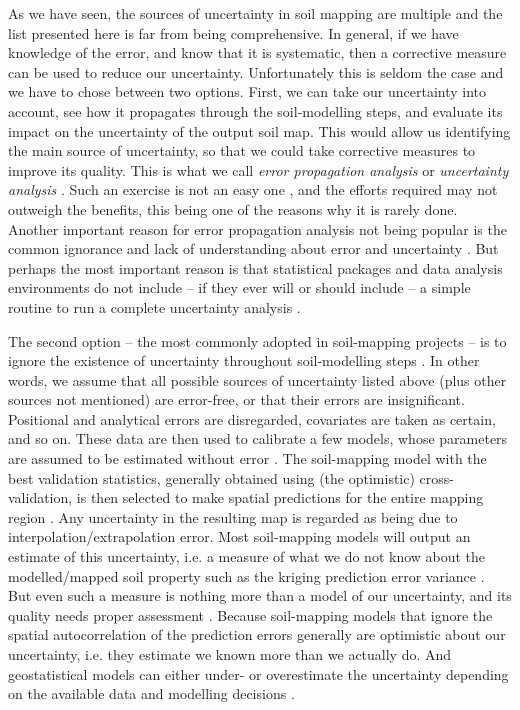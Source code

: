 As we have seen, the sources of uncertainty in soil mapping are multiple and the list presented here
is far from being comprehensive. In general, if we have knowledge of the error, and know that it is
systematic, then a corrective measure can be used to reduce our uncertainty. Unfortunately this is 
seldom the case and we have to chose between two options. First, we can take our uncertainty into 
account, see how it propagates through the soil-modelling steps, and evaluate its impact on the 
uncertainty of the output soil map. This would allow us identifying the main source of uncertainty,
so that we could take corrective measures to improve its quality. This is what we call 
\textit{error propagation analysis} or \textit{uncertainty analysis} \citep{HeuvelinkEtAl1989, 
Taylor1997}. Such an exercise is not an easy one \citep{NelsonEtAl2011}, and the efforts required 
may not outweigh the benefits, this being one of the reasons why it is rarely done. Another 
important reason for error propagation analysis not being popular is the common ignorance and lack 
of understanding about error and uncertainty \citep{Wechsler2003, Heuvelink2005}. But perhaps the 
most important reason is that statistical packages and data analysis environments do not include 
-- if they ever will or should include -- a simple routine to run a complete uncertainty analysis 
\citep{HeuvelinkEtAl2006b}.

The second option -- the most commonly adopted in soil-mapping projects -- is to ignore the 
existence of uncertainty throughout soil-modelling steps \citep{McBratneyEtAl2003, ScullEtAl2003}. 
In other words, we assume that all possible sources of uncertainty listed above (plus other sources 
not mentioned) are error-free, or that their errors are insignificant. Positional and analytical 
errors are disregarded, covariates are taken as certain, and so on. These data are then used to 
calibrate a few models, whose parameters are assumed to be estimated without error 
\citep{DiggleEtAl1998}. The soil-mapping model with the best validation statistics, generally 
obtained using (the optimistic) cross-validation, is then selected to make spatial predictions for 
the entire mapping region \citep{BrusEtAl2011}. Any uncertainty in the resulting map is regarded as 
being due to interpolation/extrapolation error. Most soil-mapping models will output an estimate of 
this uncertainty, i.e. a measure of what we do not know about the modelled/mapped soil property such 
as the kriging prediction error variance \citep{HeuvelinkEtAl1989}. But even such a measure is nothing 
more than a model of our uncertainty, and its quality needs proper assessment \citep{Goovaerts2001}.
Because soil-mapping models that ignore the spatial autocorrelation of the prediction errors 
generally are optimistic about our uncertainty, i.e. they estimate we known more than we actually 
do. And geostatistical models can either under- or overestimate the uncertainty depending on the 
available data and modelling decisions \citep{Lark2000a}.

